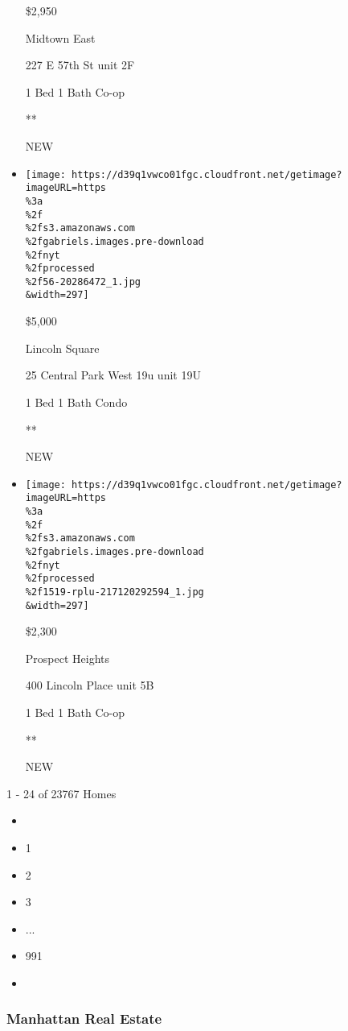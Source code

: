 \begin{itemize}
  \$2,950

  Midtown East

  227 E 57th St unit 2F

  1 Bed \textbar{} 1 Bath \textbar{} Co-op

  **

  NEW
\item
  \href{/real-estate/usa/ny/new-york/lincoln-square/homes-for-rent/25-central-park-west-19u/56-20286472?}{}

  \texttt{[image: https://d39q1vwco01fgc.cloudfront.net/getimage?imageURL=https\\\%3a\\\%2f\\\%2fs3.amazonaws.com\\\%2fgabriels.images.pre-download\\\%2fnyt\\\%2fprocessed\\\%2f56-20286472\_1.jpg\\\&width=297]}

  \$5,000

  Lincoln Square

  25 Central Park West 19u unit 19U

  1 Bed \textbar{} 1 Bath \textbar{} Condo

  **

  NEW
\item
  \href{/real-estate/usa/ny/brooklyn/prospect-heights/homes-for-rent/400-lincoln-place/1519-RPLU-217120292594?}{}

  \texttt{[image: https://d39q1vwco01fgc.cloudfront.net/getimage?imageURL=https\\\%3a\\\%2f\\\%2fs3.amazonaws.com\\\%2fgabriels.images.pre-download\\\%2fnyt\\\%2fprocessed\\\%2f1519-rplu-217120292594\_1.jpg\\\&width=297]}

  \$2,300

  Prospect Heights

  400 Lincoln Place unit 5B

  1 Bed \textbar{} 1 Bath \textbar{} Co-op

  **

  NEW
\end{itemize}

1 - 24 of 23767 Homes

\begin{itemize}
\item
\item
  1
\item
  2
\item
  3
\item
  ...
\item
  991
\item
\end{itemize}

\hypertarget{manhattan-real-estate}{%
\subsubsection{Manhattan Real Estate}\label{manhattan-real-estate}}

